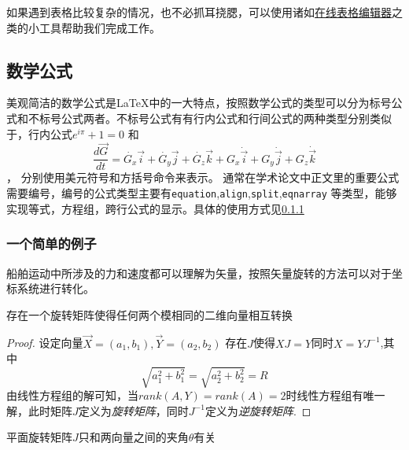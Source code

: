 如果遇到表格比较复杂的情况，也不必抓耳挠腮，可以使用诸如\href{http://www.tablesgenerator.com}{在线表格编辑器}之类的小工具帮助我们完成工作。
\subsection{数学公式}

美观简洁的数学公式是\LaTeX 中的一大特点，按照数学公式的类型可以分为标号公式和不标号公式两者。不标号公式有有行内公式和行间公式的两种类型分别类似于，行内公式$ e^{i\pi}+1=0 $ 和\[ \dfrac{d\vec{G}}{dt}=\dot{G_x}\vec{i}+\dot{G_y}\vec{j}+\dot{G_z}\vec{k}+G_x\dot{\vec{i}}+G_y\dot{\vec{j}}+G_z\dot{\vec{k}} \]，
分别使用美元符号和方括号命令来表示。 通常在学术论文中正文里的重要公式需要编号，编号的公式类型主要有\verb|equation|,\verb|align|,\verb|split|,\verb|eqnarray| 等类型，能够实现等式，方程组，跨行公式的显示。具体的使用方式见\ref{example}
\subsubsection{一个简单的例子}\label{example}
船舶运动中所涉及的力和速度都可以理解为矢量，按照矢量旋转的方法可以对于坐标系统进行转化。
\begin{lemma}
\label{2Drot} 
存在一个旋转矩阵使得任何两个模相同的二维向量相互转换
\end{lemma}
\begin{proof}
设定向量$\vec{X}=(a_1,b_1),\vec{Y}=(a_2,b_2)$ 存在$ J $使得$ XJ=Y $同时$X=YJ^{-1}$,其中\[  \sqrt{a_1^{2}+b_1^{2}}=\sqrt{a_2^{2}+b_2^{2}}=R \] 
由线性方程组的解可知，当$rank(A,Y)=rank(A)=2$时线性方程组有唯一解，此时矩阵$ J $定义为\textit{旋转矩阵}，同时$ J^{-1} $定义为\textit{逆旋转矩阵}.
\end{proof}
\begin{theorem}
\label{rotM}
平面旋转矩阵$ J $只和两向量之间的夹角$ \theta $有关
\end{theorem}

